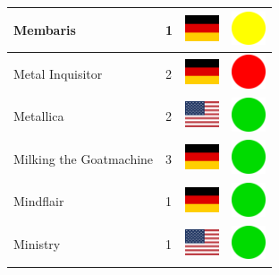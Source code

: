 \documentclass[12pt, a4paper, twoside]{report}
\begin{document}
\begin{center}
\begin{longtable}{|p{5cm}|p{2cm}|p{2cm}|p{2cm}|}
			Membaris & 1 & \includegraphics[width=1cm]{4x3/de} & \includegraphics[width=1cm]{likes/m} \\ \hline
			Metal Inquisitor & 2 & \includegraphics[width=1cm]{4x3/de} & \includegraphics[width=1cm]{likes/n} \\ \hline
			Metallica & 2 & \includegraphics[width=1cm]{4x3/us} & \includegraphics[width=1cm]{likes/y} \\ \hline
			Milking the Goatmachine & 3 & \includegraphics[width=1cm]{4x3/de} & \includegraphics[width=1cm]{likes/y} \\ \hline
			Mindflair & 1 & \includegraphics[width=1cm]{4x3/de} & \includegraphics[width=1cm]{likes/y} \\ \hline
			Ministry & 1 & \includegraphics[width=1cm]{4x3/us} & \includegraphics[width=1cm]{likes/y} \\ \hline

\end{longtable}
\end{center}
\end{document}
